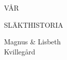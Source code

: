 \cleardoublepage

\thispagestyle{empty}


\begin{center}
    \vspace*{30pt}
	\Huge\MakeUppercase VÅR \par
	\Huge\MakeUppercase SLÄKTHISTORIA\par
	\vspace{0pt}
	\par
	\vspace{15pt}
	\LARGE Magnus \& Lisbeth\\[3pt]
	Kvillegård\par

\end{center}
